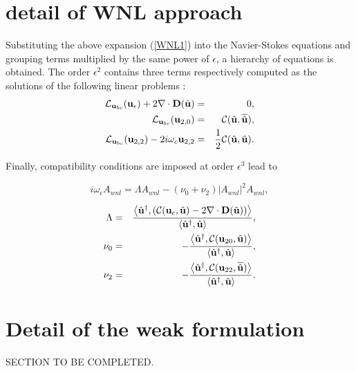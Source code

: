 \documentclass[twocolumn,10pt]{asme2ej}
\newcommand{\be}[1]{ \begin{equation} \label{#1}}
\newcommand{\ee}{\end{equation}}
\begin{document}
\section{detail of WNL approach}


Substituting the above expansion (\ref{WNL1}) into the Navier-Stokes equations and grouping terms 
multiplied by the same power of $\epsilon$, a hierarchy of equations is obtained.
The order $\epsilon^2$ contains three terms respectively computed as the solutions of the following linear problems :
\begin{eqnarray}
{\cal L}_{{\bf u}_{bc}} ({\bf u}_\epsilon) + 2 \nabla \cdot {\bf D}( \hat{\bf u}) &=&0,\\
{\cal L}_{{\bf u}_{bc}} ({\bf u}_{2,0}) &=& {\cal C}(\hat{\bf u},\overline{\hat{\bf u}}),\\
{\cal L}_{{\bf u}_{bc}} ({\bf u}_{2,2}) - 2 i \omega_c {\bf u}_{2,2}  &=& \frac{1}{2} {\cal C}(\hat{\bf u},\hat{\bf u}).
 \end{eqnarray}

Finally, compatibility conditions are imposed at order $\epsilon^3$ lead to 

\be{WNL3}
i \omega_\epsilon A_{wnl} = \Lambda A_{wnl} - (\nu_0+\nu_2)  |A_{wnl}|^2 A_{wnl},
\ee


\begin{eqnarray}
\Lambda &=& \frac{ \left< {\hat{\bf u}}^\dag, 
\left( {\cal C}({\bf u}_\epsilon, \hat{\bf u}) - 2 \nabla \cdot  {\bf D}( \hat{\bf u}) \right) \right>}
{  \left<  \hat{\bf u}^\dag,\hat{\bf u} \right> },\\
\nu_0 &=& -\frac{ \left< {\hat{\bf u}}^\dag,  {\cal C}({\bf u}_{20}, \hat{\bf u} ) \right>}
{  \left<  \hat{\bf u}^\dag,\hat{\bf u} \right> },\\
\nu_2 &=& -\frac{ \left< {\hat{\bf u}}^\dag,  {\cal C}({\bf u}_{22}, \overline{\hat{\bf u}})  \right>}
{  \left<  \hat{\bf u}^\dag,\hat{\bf u} \right> }.
 \end{eqnarray}



\section{Detail of the weak formulation}

SECTION TO BE COMPLETED.
\end{document}
